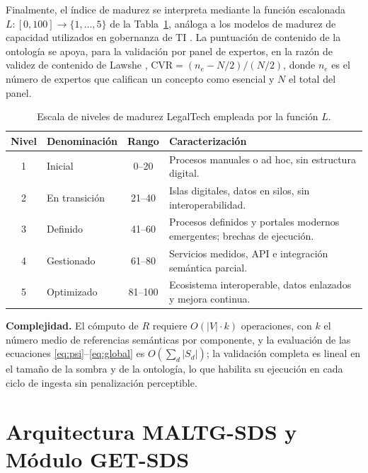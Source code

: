 \documentclass[computers,article,submit,pdftex,moreauthors]{Definitions/mdpi}
\begin{document}
Finalmente, el índice de madurez se interpreta mediante la función escalonada $L: [0,100] \rightarrow \{1,\dots,5\}$ de la Tabla~\ref{tab:levels}, análoga a los modelos de madurez de capacidad utilizados en gobernanza de TI \cite{DeHaes2013}. La puntuación de contenido de la ontología se apoya, para la validación por panel de expertos, en la razón de validez de contenido de Lawshe \cite{Lawshe1975}, $\mathrm{CVR} = (n_e - N/2)/(N/2)$, donde $n_e$ es el número de expertos que califican un concepto como esencial y $N$ el total del panel.

\begin{table}[H]
\caption{Escala de niveles de madurez LegalTech empleada por la función $L$.}
\label{tab:levels}
\begin{tabularx}{\textwidth}{clcX}
\toprule
\textbf{Nivel} & \textbf{Denominación} & \textbf{Rango} & \textbf{Caracterización}\\
\midrule
1 & Inicial & 0--20 & Procesos manuales o ad hoc, sin estructura digital.\\
2 & En transición & 21--40 & Islas digitales, datos en silos, sin interoperabilidad.\\
3 & Definido & 41--60 & Procesos definidos y portales modernos emergentes; brechas de ejecución.\\
4 & Gestionado & 61--80 & Servicios medidos, API e integración semántica parcial.\\
5 & Optimizado & 81--100 & Ecosistema interoperable, datos enlazados y mejora continua.\\
\bottomrule
\end{tabularx}
\end{table}

\textbf{Complejidad.} El cómputo de $R$ requiere $O(|V| \cdot k)$ operaciones, con $k$ el número medio de referencias semánticas por componente, y la evaluación de las ecuaciones \eqref{eq:psi}--\eqref{eq:global} es $O\!\left(\sum_{d} |S_d|\right)$; la validación completa es lineal en el tamaño de la sombra y de la ontología, lo que habilita su ejecución en cada ciclo de ingesta sin penalización perceptible.

\section{Arquitectura MALTG-SDS y Módulo GET-SDS}
\label{sec:arch}
\end{document}
